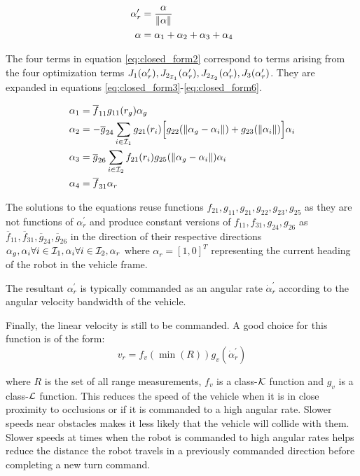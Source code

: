 \begin{align}
	\alpha_r^\prime &= \frac{\alpha}{\left\lVert\alpha\right\rVert} \label{eq:closed_form1} \\
	\alpha &= \alpha_1 + \alpha_2 + \alpha_3 + \alpha_4 \label{eq:closed_form2}
\end{align}

The four terms in equation \ref{eq:closed_form2} correspond to terms arising from the four optimization terms $J_1(\alpha_r^\prime), J_{2_{{\cal I}_1}}(\alpha_r^\prime), J_{2_{{\cal I}_2}}(\alpha_r^\prime), J_3(\alpha_r^\prime)$.
They are expanded in equations \ref{eq:closed_form3}-\ref{eq:closed_form6}.

\begin{align}
	\alpha_1 &= \overline f_{11}g_{11}(r_g)\alpha_g \label{eq:closed_form3} \\
	\alpha_2 &= - \overline g_{24} \sum_{i \in {\cal I}_1} g_{21}(r_i)\Big [ g_{22}(\left\lVert\alpha_g - \alpha_i\right\rVert) + g_{23}(\left\lVert\alpha_i\right\rVert) \Big ] \alpha_i
					\label{eq:closed_form4} \\
	\alpha_3 &= \overline g_{26} \sum_{i \in {\cal I}_2} f_{21}(r_i) g_{25}(\left\lVert\alpha_g - \alpha_i\right\rVert)\alpha_i \label{eq:closed_form5} \\
	\alpha_4 &= \overline f_{31} \alpha_r \label{eq:closed_form6}
\end{align}

The solutions to the equations reuse functions $f_{21}, g_{11}, g_{21}, g_{22}, g_{23}, g_{25}$ as they are not functions of $\alpha_r^\prime$ and produce constant versions
of $f_{11}, f_{31}, g_{24}, g_{26}$ as $\overline f_{11}, \overline f_{31}, \overline g_{24}, \overline g_{26}$ in the direction of their respective directions
$\alpha_g, \alpha_i \forall i \in {\cal I}_1, \alpha_i \forall i \in {\cal I}_2, \alpha_r$ where $\alpha_r = [1,0]^T$ representing the current heading of 
the robot in the vehicle frame.

The resultant $\alpha_r^\prime$ is typically commanded as an angular rate $\dot \alpha_r^\prime$ according to the angular velocity bandwidth of the vehicle.

Finally, the linear velocity is still to be commanded. A good choice for this function is of the form:
\begin{equation}
	v_r = f_v(\min(R))g_v(\dot \alpha_r^\prime)
\label{eq:linear_velocity1}
\end{equation}

where $R$ is the set of all range measurements, $f_v$ is a class-${\cal K}$ function and $g_v$ is a class-${\cal L}$ function. 
This reduces the speed of the vehicle when it is in close proximity to occlusions or if it is commanded to a high angular rate.
Slower speeds near obstacles makes it less likely that the vehicle will collide with them. Slower speeds at times when the robot is commanded to
high angular rates helps reduce the distance the robot travels in a previously commanded direction before completing a new 
turn command.

